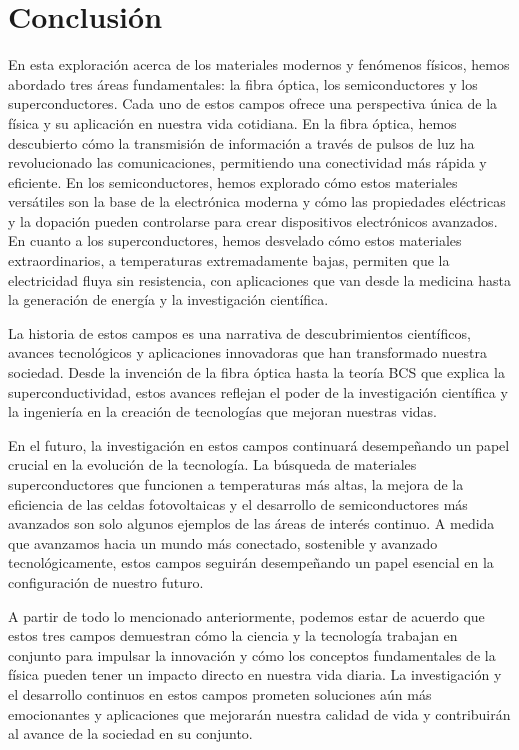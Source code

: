 \documentclass[10.5pt]{article}
\begin{document}
    \section*{Conclusión}
    En esta exploración acerca de los materiales modernos y fenómenos físicos, hemos abordado tres áreas fundamentales: la fibra óptica, los semiconductores y los superconductores. Cada uno de estos campos ofrece una perspectiva única de la física y su aplicación en nuestra vida cotidiana. En la fibra óptica, hemos descubierto cómo la transmisión de información a través de pulsos de luz ha revolucionado las comunicaciones, permitiendo una conectividad más rápida y eficiente. En los semiconductores, hemos explorado cómo estos materiales versátiles son la base de la electrónica moderna y cómo las propiedades eléctricas y la dopación pueden controlarse para crear dispositivos electrónicos avanzados. En cuanto a los superconductores, hemos desvelado cómo estos materiales extraordinarios, a temperaturas extremadamente bajas, permiten que la electricidad fluya sin resistencia, con aplicaciones que van desde la medicina hasta la generación de energía y la investigación científica.

    La historia de estos campos es una narrativa de descubrimientos científicos, avances tecnológicos y aplicaciones innovadoras que han transformado nuestra sociedad. Desde la invención de la fibra óptica hasta la teoría BCS que explica la superconductividad, estos avances reflejan el poder de la investigación científica y la ingeniería en la creación de tecnologías que mejoran nuestras vidas.

    En el futuro, la investigación en estos campos continuará desempeñando un papel crucial en la evolución de la tecnología. La búsqueda de materiales superconductores que funcionen a temperaturas más altas, la mejora de la eficiencia de las celdas fotovoltaicas y el desarrollo de semiconductores más avanzados son solo algunos ejemplos de las áreas de interés continuo. A medida que avanzamos hacia un mundo más conectado, sostenible y avanzado tecnológicamente, estos campos seguirán desempeñando un papel esencial en la configuración de nuestro futuro.

    A partir de todo lo mencionado anteriormente, podemos estar de acuerdo que estos tres campos demuestran cómo la ciencia y la tecnología trabajan en conjunto para impulsar la innovación y cómo los conceptos fundamentales de la física pueden tener un impacto directo en nuestra vida diaria. La investigación y el desarrollo continuos en estos campos prometen soluciones aún más emocionantes y aplicaciones que mejorarán nuestra calidad de vida y contribuirán al avance de la sociedad en su conjunto.
    
    
\end{document}
